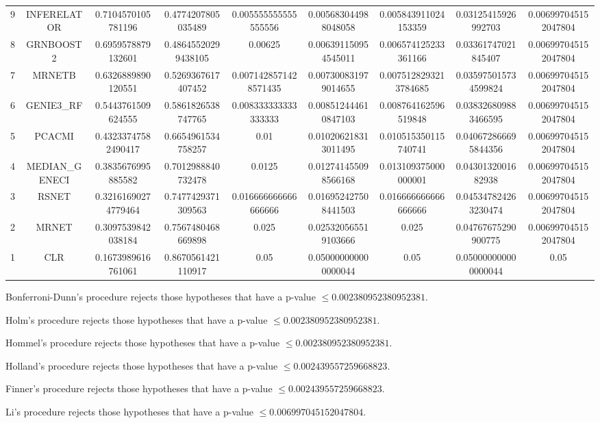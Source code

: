 \documentclass[a4paper,10pt]{article}
\begin{document}
\begin{landscape}
\begin{table}[!htp]
\begin{tabular}{ccccccccc}
9&INFERELATOR&0.7104570105781196&0.4774207805035489&0.005555555555555556&0.005683044988048058&0.005843911024153359&0.03125415926992703&0.006997045152047804\\
8&GRNBOOST2&0.6959578879132601&0.48645520299438105&0.00625&0.006391150954545011&0.006574125233361166&0.03361747021845407&0.006997045152047804\\
7&MRNETB&0.6326889890120551&0.5269367617407452&0.0071428571428571435&0.007300831979014655&0.0075128293213784685&0.035975015734599824&0.006997045152047804\\
6&GENIE3_RF&0.5443761509624555&0.5861826538747765&0.008333333333333333&0.008512444610847103&0.008764162596519848&0.038326809883466595&0.006997045152047804\\
5&PCACMI&0.43233747582490417&0.6654961534758257&0.01&0.010206218313011495&0.010515350115740741&0.040672866695844356&0.006997045152047804\\
4&MEDIAN_GENECI&0.3835676995885582&0.7012988840732478&0.0125&0.012741455098566168&0.013109375000000001&0.0430132001682938&0.006997045152047804\\
3&RSNET&0.32161690274779464&0.7477429371309563&0.016666666666666666&0.016952427508441503&0.016666666666666666&0.045347824263230474&0.006997045152047804\\
2&MRNET&0.3097539842038184&0.7567480468669898&0.025&0.025320565519103666&0.025&0.04767675290900775&0.006997045152047804\\
1&CLR&0.1673989616761061&0.8670561421110917&0.05&0.050000000000000044&0.05&0.050000000000000044&0.05\\
\hline
\end{tabular}
\end{table}
Bonferroni-Dunn's procedure rejects those hypotheses that have a p-value $\le0.002380952380952381$.


Holm's procedure rejects those hypotheses that have a p-value $\le0.002380952380952381$.


Hommel's procedure rejects those hypotheses that have a p-value $\le0.002380952380952381$.


Holland's procedure rejects those hypotheses that have a p-value $\le0.002439557259668823$.


Finner's procedure rejects those hypotheses that have a p-value $\le0.002439557259668823$.


Li's procedure rejects those hypotheses that have a p-value $\le0.006997045152047804$.



\newpage


\end{landscape}
\end{document}
